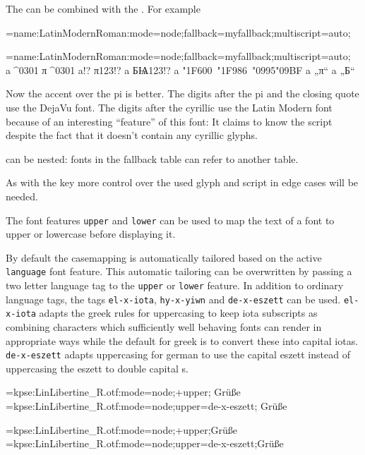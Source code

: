    The  can be combined with the . For example

   \beginlisting
   \font\test={name:LatinModernRoman:mode=node;fallback=myfallback;multiscript=auto;}
   \endlisting

   {\Large
    \font\test={name:LatinModernRoman:mode=node;fallback=myfallback;multiscript=auto;} a^^^^0301 π^^^^0301 a!? π123!? a БѨ123!? a \char"1F600\ \char"1F986\ \char"0995\char"09BF a „π“ a „Б“
   }

   Now the accent over the pi is better. The digits after the pi and the closing quote use the DejaVu font. The digits after
   the cyrillic use the Latin Modern font because of an interesting \enquote{feature} of this font: It claims to know the  script despite the fact that it doesn't contain any cyrillic glyphs.

    can be nested: fonts in the fallback table can refer to another  table.

   As with the  key more control over the used glyph and script in edge cases will be needed.
   \endaltitem

   The\label{upperlower}
   font features \texttt{upper} and \texttt{lower} can be used to map
   the text of a font to upper or lowercase before displaying it.

   By default the casemapping is automatically tailored based on the active
   \texttt{language} font feature. This automatic tailoring can be overwritten
   by passing a two letter language tag to the \texttt{upper} or \texttt{lower}
   feature. In addition to ordinary language tags, the tags \texttt{el-x-iota},
   \texttt{hy-x-yiwn} and \texttt{de-x-eszett} can be used. \texttt{el-x-iota}
   adapts the greek rules for uppercasing to keep iota subscripts as combining
   characters which sufficiently well behaving fonts can render in appropriate
   ways while the default for greek is to convert these into capital iotas.
   \texttt{de-x-eszett} adapts uppercasing for german to use the capital eszett
   instead of uppercasing the eszett to double capital s.

   \beginlisting
   \font\test={kpse:LinLibertine_R.otf:mode=node;+upper;}
   \test Grüße
   \font\test={kpse:LinLibertine_R.otf:mode=node;upper=de-x-eszett;}
   \test Grüße
   \endlisting

   {\Large
     \font\test={kpse:LinLibertine\string_R.otf:mode=node;+upper;}\test Grüße
     \font\test={kpse:LinLibertine\string_R.otf:mode=node;upper=de-x-eszett;}\test Grüße
   }

